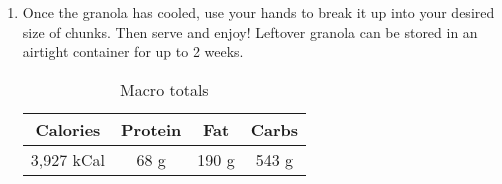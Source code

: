 \begin{multicols}{2}
\begin{enumerate}
\item Once the granola has cooled, use your hands to break it up into your desired size of chunks. Then serve and enjoy! Leftover granola can be stored in an airtight container for up to 2 weeks.

\begin{table}[H]
  \begin{center}
    \caption{Macro totals}
    \label{tab:table1}
    \begin{tabular}{c|c|c|c} %
      \textbf{Calories} & \textbf{Protein} & \textbf{Fat} & \textbf{Carbs}\\
      \hline
      3,927 kCal & 68 g & 190 g & 543 g\\
    \end{tabular}
  \end{center}
\end{table}
 
\end{enumerate}
\end{multicols}